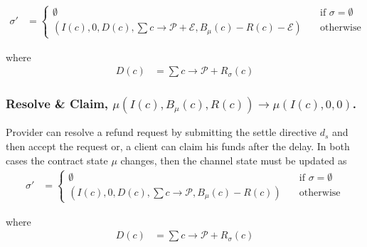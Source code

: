 \documentclass{llncs}
\begin{document}
\begin{equation*}
\begin{split}
  \sigma' &=
  \begin{cases}
      \emptyset & \quad \text{if } \sigma = \emptyset \\
      (I(c), 0, D(c), \textstyle \sum c \rightarrow \mathcal{P} + \mathcal{E},B_\mu(c) - R(c) - \mathcal{E}) & \quad \text{otherwise}
  \end{cases}
\end{split}
\end{equation*}

where
\begin{equation*}
\begin{split}
    D(c) &= \textstyle\sum c \rightarrow \mathcal{P} + R_\sigma(c)
\end{split}
\end{equation*}

\subsubsection{Resolve \& Claim, $\mu(I(c), B_\mu(c), R(c)) \rightarrow \mu(I(c), 0, 0)$.} Provider can resolve a refund request by submitting the settle directive $d_s$ and then accept the request or, a client can claim his funds after the delay. In both cases the contract state $\mu$ changes, then the channel state must be updated as
\begin{equation*}
\begin{split}
  \sigma' &=
  \begin{cases}
      \emptyset & \quad \text{if } \sigma = \emptyset \\
      (I(c), 0, D(c), \textstyle \sum c \rightarrow \mathcal{P},B_\mu(c) - R(c)) & \quad \text{otherwise}
  \end{cases}
\end{split}
\end{equation*}

where
\begin{equation*}
\begin{split}
    D(c) &= \textstyle\sum c \rightarrow \mathcal{P} + R_\sigma(c)
\end{split}
\end{equation*}
\end{document}

